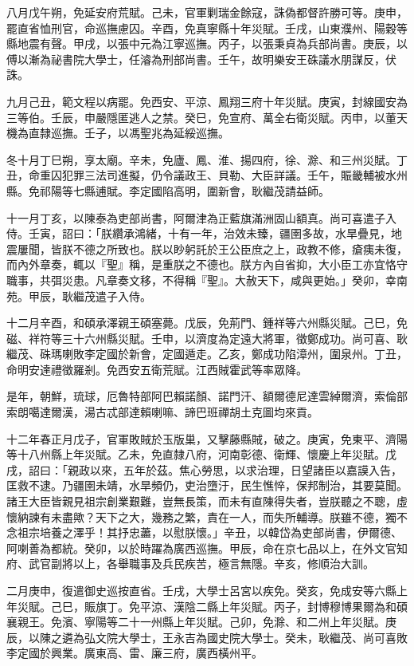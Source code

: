 \begin{pinyinscope}
八月戊午朔，免延安府荒賦。己未，官軍剿瑞金餘寇，誅偽都督許勝可等。庚申，罷直省恤刑官，命巡撫慮囚。辛酉，免真寧縣十年災賦。壬戌，山東濮州、陽穀等縣地震有聲。甲戌，以張中元為江寧巡撫。丙子，以張秉貞為兵部尚書。庚辰，以傅以漸為祕書院大學士，任濬為刑部尚書。壬午，故明樂安王硃議水朋謀反，伏誅。

九月己丑，範文程以病罷。免西安、平涼、鳳翔三府十年災賦。庚寅，封線國安為三等伯。壬辰，申嚴隱匿逃人之禁。癸巳，免宣府、萬全右衛災賦。丙申，以董天機為直隸巡撫。壬子，以馮聖兆為延綏巡撫。

冬十月丁巳朔，享太廟。辛未，免廬、鳳、淮、揚四府，徐、滁、和三州災賦。丁丑，命重囚犯罪三法司進擬，仍令議政王、貝勒、大臣詳議。壬午，賑畿輔被水州縣。免祁陽等七縣逋賦。李定國陷高明，圍新會，耿繼茂請益師。

十一月丁亥，以陳泰為吏部尚書，阿爾津為正藍旗滿洲固山額真。尚可喜遣子入侍。壬寅，詔曰：「朕纘承鴻緒，十有一年，治效未臻，疆圉多故，水旱疊見，地震屢聞，皆朕不德之所致也。朕以眇躬託於王公臣庶之上，政教不修，瘡痍未復，而內外章奏，輒以『聖』稱，是重朕之不德也。朕方內自省抑，大小臣工亦宜恪守職事，共弭災患。凡章奏文移，不得稱『聖』。大赦天下，咸與更始。」癸卯，幸南苑。甲辰，耿繼茂遣子入侍。

十二月辛酉，和碩承澤親王碩塞薨。戊辰，免荊門、鍾祥等六州縣災賦。己巳，免磁、祥符等三十六州縣災賦。壬申，以濟度為定遠大將軍，徵鄭成功。尚可喜、耿繼茂、硃瑪喇敗李定國於新會，定國遁走。乙亥，鄭成功陷漳州，圍泉州。丁丑，命明安達禮徵羅剎。免西安五衛荒賦。江西賊霍武等率眾降。

是年，朝鮮，琉球，厄魯特部阿巴賴諾顏、諾門汗、額爾德尼達雲綽爾濟，索倫部索朗噶達爾漢，湯古忒部達賴喇嘛、諦巴班禪胡土克圖均來貢。

十二年春正月戊子，官軍敗賊於玉版巢，又擊藤縣賊，破之。庚寅，免東平、濟陽等十八州縣上年災賦。乙未，免直隸八府，河南彰德、衛輝、懷慶上年災賦。戊戌，詔曰：「親政以來，五年於茲。焦心勞思，以求治理，日望諸臣以嘉謨入告，匡救不逮。乃疆圉未靖，水旱頻仍，吏治墮汙，民生憔悴，保邦制治，其要莫聞。諸王大臣皆親見祖宗創業艱難，豈無長策，而未有直陳得失者，豈朕聽之不聰，虛懷納諫有未盡歟？天下之大，幾務之繁，責在一人，而失所輔導。朕雖不德，獨不念祖宗培養之澤乎！其抒忠藎，以慰朕懷。」辛丑，以韓岱為吏部尚書，伊爾德、阿喇善為都統。癸卯，以於時躍為廣西巡撫。甲辰，命在京七品以上，在外文官知府、武官副將以上，各舉職事及兵民疾苦，極言無隱。辛亥，修順治大訓。

二月庚申，復遣御史巡按直省。壬戌，大學士呂宮以疾免。癸亥，免成安等六縣上年災賦。己巳，賑旗丁。免平涼、漢陰二縣上年災賦。丙子，封博穆博果爾為和碩襄親王。免濱、寧陽等二十一州縣上年災賦。己卯，免滁、和二州上年災賦。庚辰，以陳之遴為弘文院大學士，王永吉為國史院大學士。癸未，耿繼茂、尚可喜敗李定國於興業。廣東高、雷、廉三府，廣西橫州平。


\end{pinyinscope}
